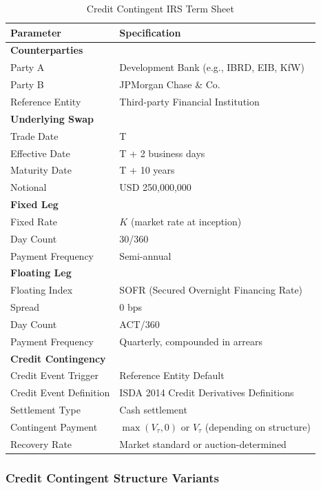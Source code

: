 \documentclass[11pt,a4paper]{article}
\theoremstyle{definition}
\begin{document}
\begin{table}[h]
\centering
\caption{Credit Contingent IRS Term Sheet}
\label{tab:ccirs_credit_terms}
\begin{tabular}{ll}
\toprule
\textbf{Parameter} & \textbf{Specification} \\
\midrule
\multicolumn{2}{l}{\textbf{Counterparties}} \\
Party A & Development Bank (e.g., IBRD, EIB, KfW) \\
Party B & JPMorgan Chase \& Co. \\
Reference Entity & Third-party Financial Institution \\
\midrule
\multicolumn{2}{l}{\textbf{Underlying Swap}} \\
Trade Date & T \\
Effective Date & T + 2 business days \\
Maturity Date & T + 10 years \\
Notional & USD 250,000,000 \\
\midrule
\multicolumn{2}{l}{\textbf{Fixed Leg}} \\
Fixed Rate & $K$ (market rate at inception) \\
Day Count & 30/360 \\
Payment Frequency & Semi-annual \\
\midrule
\multicolumn{2}{l}{\textbf{Floating Leg}} \\
Floating Index & SOFR (Secured Overnight Financing Rate) \\
Spread & 0 bps \\
Day Count & ACT/360 \\
Payment Frequency & Quarterly, compounded in arrears \\
\midrule
\multicolumn{2}{l}{\textbf{Credit Contingency}} \\
Credit Event Trigger & Reference Entity Default \\
Credit Event Definition & ISDA 2014 Credit Derivatives Definitions \\
Settlement Type & Cash settlement \\
Contingent Payment & $\max(V_{\tau}, 0)$ or $V_{\tau}$ (depending on structure) \\
Recovery Rate & Market standard or auction-determined \\
\bottomrule
\end{tabular}
\end{table}

\subsubsection{Credit Contingent Structure Variants}
\end{document}
